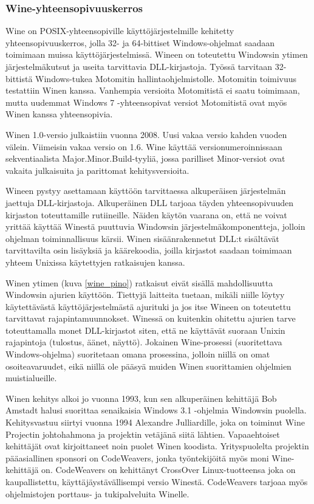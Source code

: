 \subsubsection{Wine-yhteensopivuuskerros}
Wine on POSIX-yhteensopiville käyttöjärjestelmille kehitetty yhteensopivuuskerros, jolla 32- ja 64-bittiset Windows-ohjelmat saadaan toimimaan muissa käyttöjärjestelmissä. Wineen on toteutettu Windowsin ytimen järjestelmäkutsut ja useita tarvittavia DLL-kirjastoja. Työssä tarvitaan 32-bittistä Windows-tukea Motomitin hallintaohjelmistolle. Motomitin toimivuus testattiin Winen kanssa. Vanhempia versioita Motomitistä ei saatu toimimaan, mutta uudemmat Windows 7 -yhteensopivat versiot Motomitistä ovat myös Winen kanssa yhteensopivia.

Winen 1.0-versio julkaistiin vuonna 2008. Uusi vakaa versio kahden vuoden välein. Viimeisin vakaa versio on 1.6. Wine käyttää versionumeroinnissaan sekventiaalista Major.Minor.Build-tyyliä, jossa parilliset Minor-versiot ovat vakaita julkaisuita ja parittomat kehitysversioita.

Wineen pystyy asettamaan käyttöön tarvittaessa alkuperäisen järjestelmän jaettuja DLL-kirjastoja. Alkuperäinen DLL tarjoaa täyden yhteensopivuuden kirjaston toteuttamille rutiineille. Näiden käytön vaarana on, että ne voivat yrittää käyttää Winestä puuttuvia Windowsin järjestelmäkomponentteja, jolloin ohjelman toiminnallisuus kärsii. Winen sisäänrakennetut DLL:t sisältävät tarvittavilta osin lisäyksiä ja käärekoodia, joilla kirjastot saadaan toimimaan yhteem Unixissa käytettyjen ratkaisujen kanssa.

Winen ytimen (kuva \ref{wine_pino}) ratkaisut eivät sisällä mahdollisuutta Windowsin ajurien käyttöön. Tiettyjä laitteita tuetaan, mikäli niille löytyy käytettävästä käyttöjärjestelmästä ajurituki ja jos itse Wineen on toteutettu tarvittavat rajapintamuunnokset. Winessä on kuitenkin ohitettu ajurien tarve toteuttamalla monet DLL-kirjastot siten, että ne käyttävät suoraan Unixin rajapintoja (tulostus, äänet, näyttö). Jokainen Wine-prosessi (suoritettava Windows-ohjelma) suoritetaan omana prosessina, jolloin niillä on omat osoiteavaruudet, eikä niillä ole pääsyä muiden Winen suorittamien ohjelmien muistialueille.

Winen kehitys alkoi jo vuonna 1993, kun sen alkuperäinen kehittäjä Bob Amstadt halusi suorittaa senaikaisia Windows 3.1 -ohjelmia Windowsin puolella. Kehitysvastuu siirtyi vuonna 1994 Alexandre Julliardille, joka on toiminut Wine Projectin johtohahmona ja projektin vetäjänä siitä lähtien. Vapaaehtoiset kehittäjät ovat kirjoittaneet noin puolet Winen koodista. Yrityspuolelta projektin pääasiallinen sponsori on CodeWeavers, jonka työntekijöitä myös moni Wine-kehittäjä on. CodeWeavers on kehittänyt CrossOver Linux-tuotteensa joka on kaupallistettu, käyttäjäystävällisempi versio Winestä. CodeWeavers tarjoaa myös ohjelmistojen porttaus- ja tukipalveluita Winelle. \citep{wine:codeweavers}


